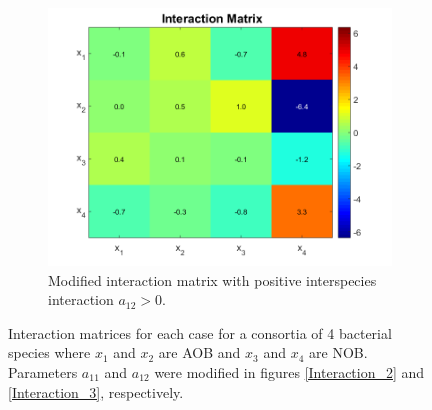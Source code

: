\documentclass[3p,times]{article}
\begin{document}
\begin{figure}[h]
\begin{subfigure}[b]{0.32\textwidth}
	\includegraphics[width=\textwidth]{Stability/Interactions_parameters_modified_2}
	\caption{Modified interaction matrix with positive interspecies interaction  $a_{12}>0$.}
	\label{Interaction_3}
\end{subfigure}
	\caption{Interaction matrices for each case for a consortia of 4 bacterial species where $x_1$ and $x_2$ are AOB and $x_3$ and $x_4$ are NOB. Parameters $a_{11}$ and $a_{12}$ were modified in figures \eqref{Interaction_2} and \eqref{Interaction_3}, respectively.}
	\label{Interactions}
\end{figure} 
\end{document}
